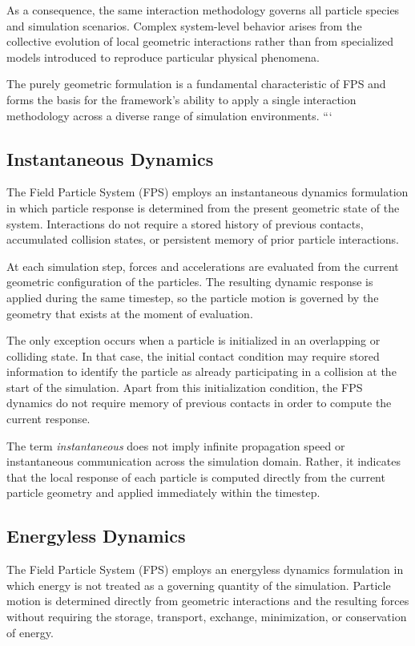 As a consequence, the same interaction methodology governs all
particle species and simulation scenarios. Complex system-level
behavior arises from the collective evolution of local
geometric interactions rather than from specialized models
introduced to reproduce particular physical phenomena.

The purely geometric formulation is a fundamental characteristic
of FPS and forms the basis for the framework's ability to apply
a single interaction methodology across a diverse range of
simulation environments.
```


\subsection{Instantaneous Dynamics}

The Field Particle System (FPS) employs an instantaneous
dynamics formulation in which particle response is determined
from the present geometric state of the system. Interactions do
not require a stored history of previous contacts, accumulated
collision states, or persistent memory of prior particle
interactions.

At each simulation step, forces and accelerations are evaluated
from the current geometric configuration of the particles. The
resulting dynamic response is applied during the same timestep,
so the particle motion is governed by the geometry that exists
at the moment of evaluation.

The only exception occurs when a particle is initialized in an
overlapping or colliding state. In that case, the initial contact
condition may require stored information to identify the particle
as already participating in a collision at the start of the
simulation. Apart from this initialization condition, the FPS
dynamics do not require memory of previous contacts in order to
compute the current response.

The term \emph{instantaneous} does not imply infinite propagation
speed or instantaneous communication across the simulation
domain. Rather, it indicates that the local response of each
particle is computed directly from the current particle geometry
and applied immediately within the timestep.

\subsection{Energyless Dynamics}

The Field Particle System (FPS) employs an energyless
dynamics formulation in which energy is not treated as a
governing quantity of the simulation. Particle motion is
determined directly from geometric interactions and the
resulting forces without requiring the storage, transport,
exchange, minimization, or conservation of energy.

